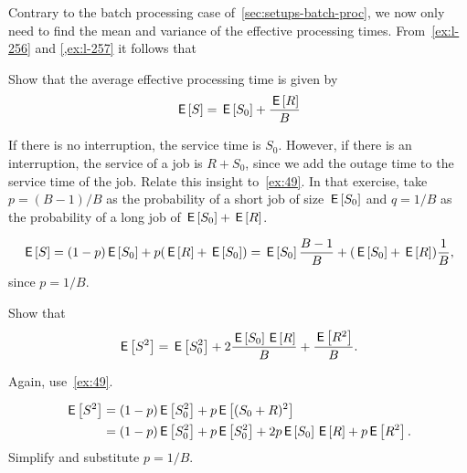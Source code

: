 Contrary to the batch processing case of~\cref{sec:setups-batch-proc}, we now only need to find the mean and variance of the effective processing times.
From~\cref{ex:l-256} and \cref{,ex:l-257} it follows that
\begin{exercise}
Show that the average effective processing time is given by
\begin{equation} \label{eq:88}
 \,\mathsf{E}\left[S\right] = \,\mathsf{E}\left[S_0\right] + \frac{\,\mathsf{E}\left[R\right]}B
\end{equation}

\begin{hint}
  If there is no interruption, the service time is $S_0$.
  However, if there is an interruption, the service of a job is $R + S_0$, since we add the outage time to the service time of the job.
  Relate this insight to~\cref{ex:49}.
  In that exercise, take $p=(B-1)/B$ as the probability of a short job of size $\,\mathsf{E}\left[S_0\right]$ and $q=1/B$ as the probability of a long job of $\,\mathsf{E}\left[S_0\right] + \,\mathsf{E}\left[R\right]$.
\end{hint}
\begin{solution}
 \begin{equation*}
 \,\mathsf{E}\left[S\right] = (1-p)\,\mathsf{E}\left[S_0\right] + p (\,\mathsf{E}\left[R\right] + \,\mathsf{E}\left[S_0\right]) = \,\mathsf{E}\left[S_0\right] \frac{B-1}B + (\,\mathsf{E}\left[S_0\right] + \,\mathsf{E}\left[R\right]) \frac 1B,
 \end{equation*}
since $p=1/B$. 
\end{solution}
\end{exercise}


\begin{extra}
 Show that
 \begin{equation*}
 \,\mathsf{E}\left[S^2\right] = \,\mathsf{E}\left[S_0^2\right] + 2\frac{\,\mathsf{E}\left[S_0\right]\,\mathsf{E}\left[R\right]} B + \frac{\,\mathsf{E}\left[R^2\right]}B.
 \end{equation*}
\begin{hint}
  Again, use~\cref{ex:49}.
\end{hint}
\begin{solution}
 \begin{align*}
 \,\mathsf{E}\left[S^2\right] 
&= (1-p) \,\mathsf{E}\left[S_0^2\right] + p \,\mathsf{E}\left[(S_0+R)^2\right]\\
&= (1-p) \,\mathsf{E}\left[S_0^2\right] + p \,\mathsf{E}\left[S_0^2\right] + 2 p \,\mathsf{E}\left[S_0\right] \,\mathsf{E}\left[R\right] + p \,\mathsf{E}\left[R^2\right]. 
 \end{align*}
 Simplify and substitute $p=1/B$. 
\end{solution}
\end{extra}

